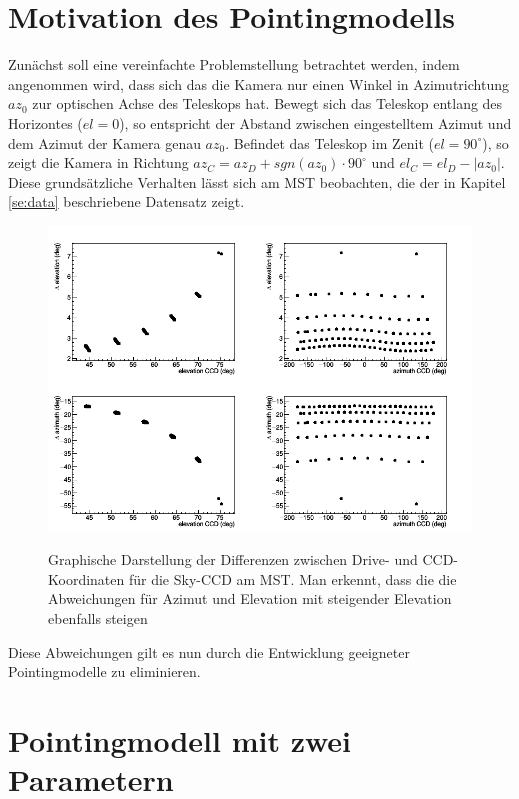 \section{Motivation des Pointingmodells}
Zunächst soll eine vereinfachte Problemstellung betrachtet werden, indem angenommen wird, dass sich das die Kamera nur einen Winkel in Azimutrichtung $az_0$ zur optischen Achse des Teleskops hat. Bewegt sich das Teleskop entlang des Horizontes ($el=0$), so entspricht der Abstand zwischen eingestelltem Azimut und dem Azimut der Kamera genau $az_0$. Befindet das Teleskop im Zenit ($el=90^{\circ}$), so zeigt die Kamera in Richtung $az_C=az_D+\unit{sgn}(az_0)\cdot90^{\circ}$ und $el_C=el_D-|az_0|$. Diese grundsätzliche Verhalten lässt sich am MST beobachten, die der in Kapitel \ref{se:data} beschriebene Datensatz zeigt.\newpage
\begin{figure}[htbp]
\centering
\includegraphics[width=\textwidth]{../341/data2.png}
\label{img:dataset}
\caption{Graphische Darstellung der Differenzen zwischen Drive- und CCD-Koordinaten für die Sky-CCD am MST. Man erkennt, dass die die Abweichungen für Azimut und Elevation mit steigender Elevation ebenfalls steigen}
\end{figure}
Diese Abweichungen gilt es nun durch die Entwicklung geeigneter Pointingmodelle zu eliminieren.
\section{Pointingmodell mit zwei Parametern}
